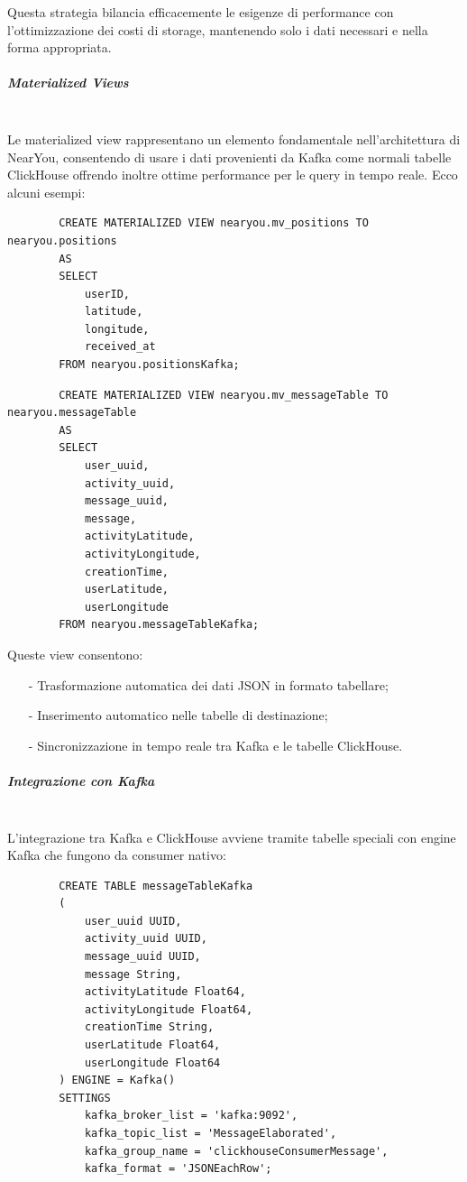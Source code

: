 \documentclass[10pt]{article}
\newcommand{\mysubparagraph}[1]{\subparagraph{#1}\mbox{}\\}
\begin{document}
        Questa strategia bilancia efficacemente le esigenze di performance con l'ottimizzazione dei costi di storage, mantenendo solo i dati necessari e nella forma appropriata.

        \mysubparagraph{Materialized Views}
        Le materialized view rappresentano un elemento fondamentale nell'architettura di NearYou, consentendo di usare i dati provenienti da Kafka come normali tabelle ClickHouse offrendo inoltre ottime performance per le query in tempo reale. Ecco alcuni esempi:

        \begin{lstlisting}
        CREATE MATERIALIZED VIEW nearyou.mv_positions TO nearyou.positions
        AS
        SELECT
            userID,
            latitude,
            longitude,
            received_at
        FROM nearyou.positionsKafka;
        \end{lstlisting}

        \begin{lstlisting}
        CREATE MATERIALIZED VIEW nearyou.mv_messageTable TO nearyou.messageTable
        AS
        SELECT
            user_uuid,
            activity_uuid,
            message_uuid,
            message,
            activityLatitude,
            activityLongitude,
            creationTime,
            userLatitude,
            userLongitude
        FROM nearyou.messageTableKafka;
        \end{lstlisting}

        Queste view consentono:
        \begin{itemize}
            \item[-] Trasformazione automatica dei dati JSON in formato tabellare;
            \item[-] Inserimento automatico nelle tabelle di destinazione;
            \item[-] Sincronizzazione in tempo reale tra Kafka e le tabelle ClickHouse.
        \end{itemize}

        \mysubparagraph{Integrazione con Kafka}
        L'integrazione tra Kafka e ClickHouse avviene tramite tabelle speciali con engine Kafka che fungono da consumer nativo:

        \begin{lstlisting}
        CREATE TABLE messageTableKafka
        (
            user_uuid UUID,
            activity_uuid UUID,
            message_uuid UUID,
            message String,
            activityLatitude Float64,
            activityLongitude Float64,
            creationTime String,
            userLatitude Float64,
            userLongitude Float64
        ) ENGINE = Kafka()
        SETTINGS
            kafka_broker_list = 'kafka:9092',
            kafka_topic_list = 'MessageElaborated',
            kafka_group_name = 'clickhouseConsumerMessage',
            kafka_format = 'JSONEachRow';
        \end{lstlisting}
\end{document}
